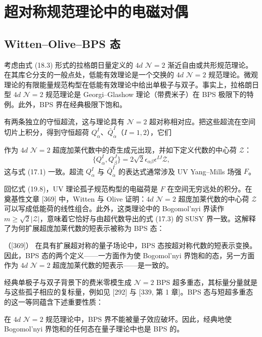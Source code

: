 \section{超对称规范理论中的电磁对偶}

\subsection{Witten--Olive--BPS 态}

考虑由式 (18.3) 形式的拉格朗日量定义的 $4d$ $\mathcal{N}=2$ 渐近自由或共形规范理论。在其库仑分支的一般点处，低能有效理论是一个交换的 $4d$ $\mathcal{N}=2$ 规范理论。微观理论的有限能量规范构型在低能有效理论中给出单极子与双子。事实上，拉格朗日型 $4d$ $\mathcal{N}=2$ 规范理论是 Georgi--Glashow 理论（带费米子）在 BPS 极限下的特例。此外，BPS 界在经典极限下饱和。

有两条独立的守恒超流，这与理论具有 $\mathcal{N}=2$ 超对称相对应。把这些超流在空间切片上积分，得到守恒超荷 $Q^I_\alpha$、$\bar Q^I_{\dot\alpha}$（$I=1,2$），它们


作为 $4d$ $\mathcal{N}=2$ 超庞加莱代数中的奇生成元出现，并如下定义代数的中心荷 $\mathcal{Z}$：
\[
\{Q^I_\alpha,Q^J_\beta\}=2\sqrt{2}\epsilon_{\alpha\beta}\epsilon^{IJ}\mathcal{Z},
\]
这与式 (17.1) 一致。超流 $Q^I_\alpha$ 与 $\bar Q^I_{\dot\alpha}$ 的表达式通常涉及 UV Yang--Mills 场强 $F$。

回忆式 (19.8)，UV 理论孤子规范构型的电磁荷是 $F$ 在空间无穷远处的积分。在奠基性文章 [369] 中，Witten 与 Olive 证明：$4d$ $\mathcal{N}=2$ 超庞加莱代数的中心荷 $\mathcal{Z}$ 可以写成低能荷的线性组合。此外，这类理论中的 Bogomol'nyi 界读作 $m\ge\sqrt{2}|\mathcal{Z}|$，意味着它恰好与由超代数导出的式 (17.3) 的 SUSY 界一致。这解释了为何扩展超庞加莱代数的短表示被称为 BPS 态：

\begin{proposition}[19.27]（{[369]}）
在具有扩展超对称的量子场论中，BPS 态按超对称代数的短表示变换。因此，BPS 态的两个定义——一方面作为使 Bogomol'nyi 界饱和的态，另一方面作为 $4d$ $\mathcal{N}=2$ 超庞加莱代数的短表示——是一致的。
\end{proposition}

经典单极子与双子背景下的费米零模生成 $\mathcal{N}=2$ BPS 超多重态，其标量分量就是与这些孤子相应的复标量，例如见 [292] 与 [339, 第 1 章]。BPS 态与短超多重态的这一等同蕴含下述重要性质：

\begin{proposition}[19.28]
在 $4d$ $\mathcal{N}=2$ 规范理论中，BPS 界不能被量子效应破坏。因此，经典地使 Bogomol'nyi 界饱和的任何态在量子理论中也是 BPS 的。
\end{proposition}

